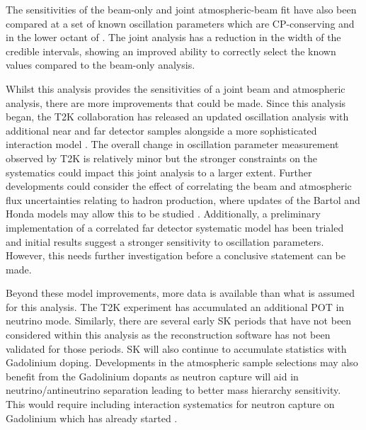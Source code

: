 The sensitivities of the beam-only and joint atmospheric-beam fit have also been compared at a set of known oscillation parameters which are CP-conserving and in the lower octant of . The joint analysis has a  reduction in the width of the \quickmath{1\sigma} credible intervals, showing an improved ability to correctly select the known values compared to the beam-only analysis.

Whilst this analysis provides the sensitivities of a joint beam and atmospheric analysis, there are more improvements that could be made. Since this analysis began, the T2K collaboration has released an updated oscillation analysis with additional near and far detector samples alongside a more sophisticated interaction model \cite{Bronner2022-wd}. The overall change in oscillation parameter measurement observed by T2K is relatively minor but the stronger constraints on the systematics could impact this joint analysis to a larger extent.
Further developments could consider the effect of correlating the beam and atmospheric flux uncertainties relating to hadron production, where updates of the Bartol and Honda models may allow this to be studied \cite{Sato2022-ss}. Additionally, a preliminary implementation of a correlated far detector systematic model has been trialed and initial results suggest a stronger sensitivity to oscillation parameters. However, this needs further investigation before a conclusive statement can be made.

Beyond these model improvements, more data is available than what is assumed for this analysis. The T2K experiment has accumulated an additional POT in neutrino mode. Similarly, there are several early SK periods that have not been considered within this analysis as the reconstruction software has not been validated for those periods. SK will also continue to accumulate statistics with Gadolinium doping. Developments in the atmospheric sample selections may also benefit from the Gadolinium dopants as neutron capture will aid in neutrino/antineutrino separation leading to better mass hierarchy sensitivity. This would require including interaction systematics for neutron capture on Gadolinium which has already started \cite{10.48550/arxiv.2209.08609}.


